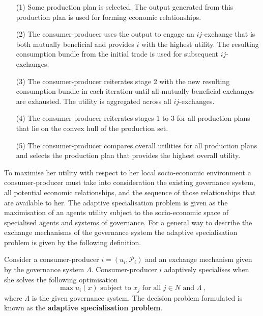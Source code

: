 \begin{itemize}
	\item[(1)] Some production plan is selected. The output generated from this production plan is used for forming economic relationships. 

	\item[(2)] The consumer-producer uses the output to engage an $ij$-exchange that is both mutually beneficial and provides $i$ with the highest utility. The resulting consumption bundle from the initial trade is used for subsequent $ij$-exchanges. 

	\item[(3)] The consumer-producer reiterates stage 2 with the new resulting consumption bundle in each iteration until all mutually beneficial exchanges are exhausted. The utility is aggregated across all $ij$-exchanges. 

	\item[(4)] The consumer-producer reiterates stages 1 to 3 for all production plans that lie on the convex hull of the production set.

	\item[(5)] The consumer-producer compares overall utilities for all production plans and selects the production plan that provides the highest overall utility.
\end{itemize}

To maximise her utility with respect to her local socio-economic environment a consumer-producer must take into consideration the existing governance system, all potential economic relationships, and the sequence of those relationships that are available to her. The adaptive specialisation problem is given as the maximisation of an agents utility subject to the socio-economic space of specialised agents and systems of governance. For a general way to describe the exchange mechanisms of the governance system the adaptive specialisation problem is given by the following definition.

\begin{definition} \label{def:adaptiveSpecialisationProblem}
Consider a consumer-producer $i = (u_{i}, \mathcal{P}_i)$ and an exchange mechanism given by the governance system $\Lambda$. Consumer-producer $i$ adaptively specialises when she solves the following optimisation
\begin{equation}
	\max u_{i}(x) \mbox{ subject to } x_{j} \mbox{ for all } j \in N \mbox{ and } \Lambda ~ ,
\end{equation}
where $\Lambda$ is the given governance system. The decision problem formulated is known as the \textbf{adaptive specialisation problem}.
\end{definition}

